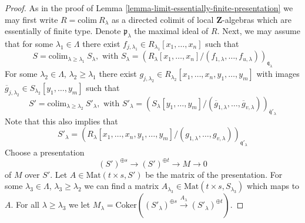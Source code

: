 \begin{proof}
As in the proof of Lemma \ref{lemma-limit-essentially-finite-presentation}
we may first write $R = \text{colim}\ R_\lambda$ as a directed colimit
of local $\mathbf{Z}$-algebras which are essentially of finite type.
Denote $\mathfrak p_\lambda$ the maximal ideal of $R$.
Next, we may assume that for some $\lambda_1 \in \Lambda$ there
exist $f_{j, \lambda_1} \in R_{\lambda_1}[x_1, \ldots, x_n]$
such that
$$
S =
\text{colim}_{\lambda \geq \lambda_1}\ S_\lambda, \text{ with }
S_\lambda = 
(R_\lambda[x_1, \ldots, x_n]/
(f_{1, \lambda}, \ldots, f_{u, \lambda}))_{\mathfrak q_\lambda}
$$
For some $\lambda_2 \in \Lambda$,
$\lambda_2 \geq \lambda_1$ there exist
$g_{j, \lambda_2} \in R_{\lambda_2}[x_1, \ldots, x_n, y_1, \ldots, y_m]$
with images
$\overline{g}_{j, \lambda_2} \in S_{\lambda_2}[y_1, \ldots, y_m]$
such that
$$
S' =
\text{colim}_{\lambda \geq \lambda_2}\ S'_\lambda, \text{ with }
S'_\lambda = 
(S_\lambda[y_1, \ldots, y_m]/
(\overline{g}_{1, \lambda}, \ldots,
\overline{g}_{v, \lambda}))_{\overline{\mathfrak q}'_\lambda}
$$
Note that this also implies that
$$
S'_\lambda = 
(R_\lambda[x_1, \ldots, x_n, y_1, \ldots, y_m]/
(g_{1, \lambda}, \ldots, g_{v, \lambda}))_{\mathfrak q'_\lambda}
$$
Choose a presentation
$$
(S')^{\oplus s} \to (S')^{\oplus t} \to M \to 0
$$
of $M$ over $S'$. Let $A \in \text{Mat}(t\times s, S')$ be
the matrix of the presentation. For some $\lambda_3 \in \Lambda$,
$\lambda_3 \geq \lambda_2$
we can find a matrix $A_{\lambda_3} \in \text{Mat}(t\times s, S_{\lambda_3})$
which maps to $A$. For all $\lambda \geq \lambda_3$ we let
$M_\lambda = \text{Coker}((S'_\lambda)^{\oplus s} \xrightarrow{A_\lambda}
(S'_\lambda)^{\oplus t})$.


\end{proof}
